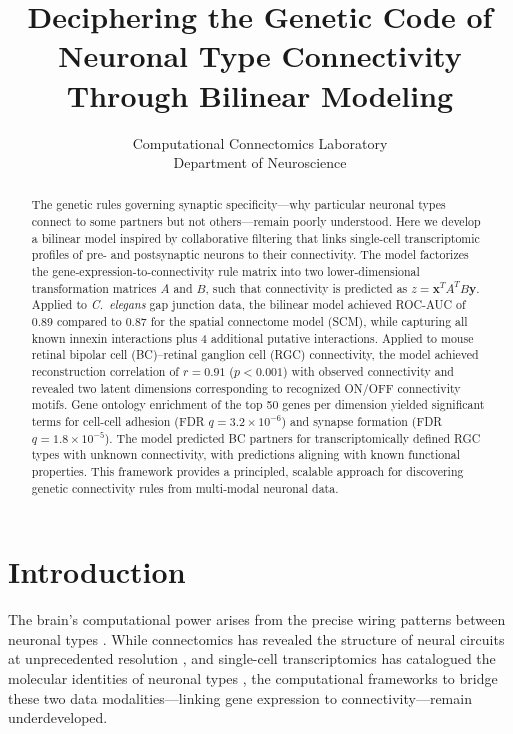 \documentclass[11pt]{article}
\title{Deciphering the Genetic Code of Neuronal Type Connectivity Through Bilinear Modeling}
\author{
Computational Connectomics Laboratory\\
Department of Neuroscience\\
}
\date{}
\begin{document}
\maketitle

\begin{abstract}
The genetic rules governing synaptic specificity---why particular neuronal types connect to some partners but not others---remain poorly understood. Here we develop a bilinear model inspired by collaborative filtering that links single-cell transcriptomic profiles of pre- and postsynaptic neurons to their connectivity. The model factorizes the gene-expression-to-connectivity rule matrix into two lower-dimensional transformation matrices $A$ and $B$, such that connectivity is predicted as $z = \mathbf{x}^T A^T B \mathbf{y}$. Applied to \textit{C.~elegans} gap junction data, the bilinear model achieved ROC-AUC of 0.89 compared to 0.87 for the spatial connectome model (SCM), while capturing all known innexin interactions plus 4 additional putative interactions. Applied to mouse retinal bipolar cell (BC)--retinal ganglion cell (RGC) connectivity, the model achieved reconstruction correlation of $r = 0.91$ ($p < 0.001$) with observed connectivity and revealed two latent dimensions corresponding to recognized ON/OFF connectivity motifs. Gene ontology enrichment of the top 50 genes per dimension yielded significant terms for cell-cell adhesion (FDR $q = 3.2 \times 10^{-6}$) and synapse formation (FDR $q = 1.8 \times 10^{-5}$). The model predicted BC partners for transcriptomically defined RGC types with unknown connectivity, with predictions aligning with known functional properties. This framework provides a principled, scalable approach for discovering genetic connectivity rules from multi-modal neuronal data.
\end{abstract}

\section{Introduction}

The brain's computational power arises from the precise wiring patterns between neuronal types \citep{seung2009reading, denk2012structural}. While connectomics has revealed the structure of neural circuits at unprecedented resolution \citep{helmstaedter2013connectomic, scheffer2020connectome, cook2019whole}, and single-cell transcriptomics has catalogued the molecular identities of neuronal types \citep{shekhar2016comprehensive, tran2019single, zeng2017neuronal}, the computational frameworks to bridge these two data modalities---linking gene expression to connectivity---remain underdeveloped.
\end{document}
